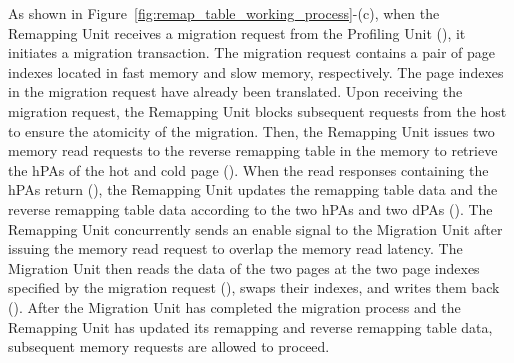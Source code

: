 

As shown in Figure~\ref{fig:remap_table_working_process}-(c), when the Remapping Unit receives a migration request from the Profiling Unit (\bone), it initiates a migration transaction. The migration request contains a pair of page indexes located in fast memory and slow memory, respectively. The page indexes in the migration request have already been translated. 
Upon receiving the migration request, the Remapping Unit blocks subsequent requests from the host to ensure the atomicity of the migration. 
Then, the Remapping Unit issues two memory read requests to the reverse remapping table in the memory to retrieve the hPAs of the hot and cold page (\btwo). 
When the read responses containing the hPAs return (\bthree), the Remapping Unit updates the remapping table data and the reverse remapping table data according to the two hPAs and two dPAs (\bfour). 
The Remapping Unit concurrently sends an enable signal to the Migration Unit after issuing the memory read request to overlap the memory read latency. 
The Migration Unit then reads the data of the two pages at the two page indexes specified by the migration request (\bsix \bseven), swaps their indexes, and writes them back (\beight \bnine). 
After the Migration Unit has completed the migration process and the Remapping Unit has updated its remapping and reverse remapping table data, subsequent memory requests are allowed to proceed.


